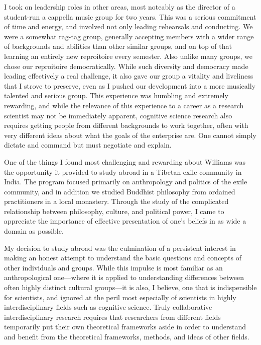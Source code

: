 \documentclass[12pt]{article}
\begin{document}
I took on leadership roles in other areas, most noteably as the director of a student-run a cappella music group for two years.  This was a serious commitment of time and energy, and involved not only leading rehearsals and conducting.  We were a somewhat rag-tag group, generally accepting members with a wider range of backgrounds and abilities than other similar groups, and on top of that learning an entirely new reproitoire every semester.  Also unlike many groups, we chose our reproitoire democratically.  While such diversity and democracy made leading effectively a real challenge, it also gave our group a vitality and liveliness that I strove to preserve, even as I pushed our development into a more musically talented and serious group.  This experience was humbling and extremely rewarding, and while the relevance of this experience to a career as a research scientist may not be immediately apparent, cognitive science research also requires getting people from different backgrounds to work together, often with very different ideas about what the goals of the enterprise are.  One cannot simply dictate and command but must negotiate and explain.


One of the things I found most challenging and rewarding about Williams was the opportunity it provided to study abroad in a Tibetan exile community in India.  The program focused primarily on anthropology and politics of the exile community, and in addition we studied Buddhist philosophy from ordained practitioners in a local monastery.  Through the study of the complicated relationship between philosophy, culture, and political power, I came to appreciate the importance of effective presentation of one's beliefs in as wide a domain as possible.

My decision to study abroad was the culmination of a persistent interest in making an honest attempt to understand the basic questions and concepts of other individuals and groups.  While this impulse is most familiar as an anthropological one---where it is applied to understanding differences between often highly distinct cultural groups---it is also, I believe, one that is indispensible for scientists, and ignored at the peril most especially of scientists in highly interdisciplinary fields such as cognitive science.  Truly collaborative interdisciplinary research requires that researchers from different fields temporarily put their own theoretical frameworks aside in order to understand and benefit from the theoretical frameworks, methods, and ideas of other fields.  
\end{document}
